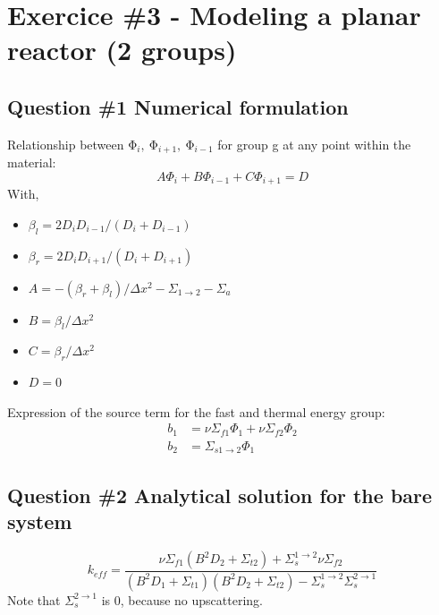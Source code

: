 \documentclass[11pt,a4paper]{article}
\begin{document}

\newpage
\section{Exercice \#3 - Modeling a planar reactor (2 groups)}

\subsection{Question \#1 Numerical formulation}

Relationship between $\mathrm{\Phi}_i,\ \mathrm{\Phi}_{i+1},\ \mathrm{\Phi}_{i-1}$ for group g at any point within the material:
\begin{equation}
	A \Phi_i + B \Phi_{i-1} +C \Phi_{i+1} = D
\end{equation}
With,
\begin{itemize}
	\item $\beta_l = 2 D_i D_{i-1} / (D_i + D_{i-1})$
	\item $\beta_r = 2 D_i D_{i+1} / (D_i + D_{i+1})$
	\item $A = -(\beta_r + \beta_l)/ \Delta x^2 - \Sigma_{1 \rightarrow 2} - \Sigma_a$
	\item $B = \beta_l/ \Delta x^2$
	\item $C = \beta_r/ \Delta x^2$
	\item $D = 0$
\end{itemize}

Expression of the source term for the fast and thermal energy group:
\begin{equation}
	\begin{split}
		b_1 &= \nu \Sigma_{f1} \Phi_1 + \nu \Sigma_{f2} \Phi_2 \\
		b_2 &= \Sigma_{s1 \rightarrow 2} \Phi_1
	\end{split}
	\end{equation}

\subsection{Question \#2 Analytical solution for the bare system}
\begin{equation}
	k_{eff}= \frac{\nu \Sigma_{f1} (B^2D_2 + \Sigma_{t2}) + \Sigma_{s}^{1 \rightarrow 2} \nu \Sigma_{f2}}{(B^2D_1 + \Sigma_{t1})(B^2D_2 + \Sigma_{t2}) - \Sigma_s^{1 \rightarrow 2} \Sigma_s^{2 \rightarrow 1}}
\end{equation}
Note that $\Sigma_s^{2 \rightarrow 1}$ is 0, because no upscattering.
\end{document}
